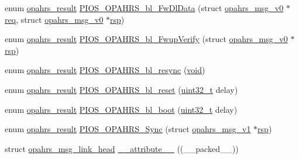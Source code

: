 \begin{DoxyCompactItemize}
\item 
enum \hyperlink{group___p_i_o_s___o_p_a_h_r_s_gaf6fe64d28ea92983e870494d0a5d05bd}{opahrs\-\_\-result} \hyperlink{group___p_i_o_s___o_p_a_h_r_s_gadd69754c1b2e212326e33fb2209ae72e}{P\-I\-O\-S\-\_\-\-O\-P\-A\-H\-R\-S\-\_\-bl\-\_\-\-Fw\-Dl\-Data} (struct \hyperlink{structopahrs__msg__v0}{opahrs\-\_\-msg\-\_\-v0} $\ast$\hyperlink{pios__opahrs__proto_8h_ad651fd9affe5ed0ac9abccd8e2791a2c}{req}, struct \hyperlink{structopahrs__msg__v0}{opahrs\-\_\-msg\-\_\-v0} $\ast$\hyperlink{pios__opahrs__proto_8h_a33704cbdda2899ee80b99a109f814568}{rsp})
\item 
enum \hyperlink{group___p_i_o_s___o_p_a_h_r_s_gaf6fe64d28ea92983e870494d0a5d05bd}{opahrs\-\_\-result} \hyperlink{group___p_i_o_s___o_p_a_h_r_s_ga4bb7842e9f92a0286d39da199a3d5247}{P\-I\-O\-S\-\_\-\-O\-P\-A\-H\-R\-S\-\_\-bl\-\_\-\-Fwup\-Verify} (struct \hyperlink{structopahrs__msg__v0}{opahrs\-\_\-msg\-\_\-v0} $\ast$\hyperlink{pios__opahrs__proto_8h_a33704cbdda2899ee80b99a109f814568}{rsp})
\item 
enum \hyperlink{group___p_i_o_s___o_p_a_h_r_s_gaf6fe64d28ea92983e870494d0a5d05bd}{opahrs\-\_\-result} \hyperlink{group___p_i_o_s___o_p_a_h_r_s_gaa8bdcd7c130fd8eb142b9d211f87be2a}{P\-I\-O\-S\-\_\-\-O\-P\-A\-H\-R\-S\-\_\-bl\-\_\-resync} (\hyperlink{group___n_a_m_e_ga18028b8badbf1ea7e704ccac3c488e82}{void})
\item 
enum \hyperlink{group___p_i_o_s___o_p_a_h_r_s_gaf6fe64d28ea92983e870494d0a5d05bd}{opahrs\-\_\-result} \hyperlink{group___p_i_o_s___o_p_a_h_r_s_gaf2be915c98324c485c1a56d17472ddde}{P\-I\-O\-S\-\_\-\-O\-P\-A\-H\-R\-S\-\_\-bl\-\_\-reset} (\hyperlink{stdint_8h_a435d1572bf3f880d55459d9805097f62}{uint32\-\_\-t} delay)
\item 
enum \hyperlink{group___p_i_o_s___o_p_a_h_r_s_gaf6fe64d28ea92983e870494d0a5d05bd}{opahrs\-\_\-result} \hyperlink{group___p_i_o_s___o_p_a_h_r_s_ga5ef319e1098cc7338f56e9eea00ed761}{P\-I\-O\-S\-\_\-\-O\-P\-A\-H\-R\-S\-\_\-bl\-\_\-boot} (\hyperlink{stdint_8h_a435d1572bf3f880d55459d9805097f62}{uint32\-\_\-t} delay)
\item 
enum \hyperlink{group___p_i_o_s___o_p_a_h_r_s_gaf6fe64d28ea92983e870494d0a5d05bd}{opahrs\-\_\-result} \hyperlink{group___p_i_o_s___o_p_a_h_r_s_gadbd0b219bada97964333612bc3394464}{P\-I\-O\-S\-\_\-\-O\-P\-A\-H\-R\-S\-\_\-\-Sync} (struct \hyperlink{structopahrs__msg__v1}{opahrs\-\_\-msg\-\_\-v1} $\ast$\hyperlink{pios__opahrs__proto_8h_a33704cbdda2899ee80b99a109f814568}{rsp})
\item 
struct \hyperlink{structopahrs__msg__link__head}{opahrs\-\_\-msg\-\_\-link\-\_\-head} \hyperlink{group___p_i_o_s___o_p_a_h_r_s_ga04dd02996eb58d8fd3c159dc959917ea}{\-\_\-\-\_\-attribute\-\_\-\-\_\-} ((\-\_\-\-\_\-packed\-\_\-\-\_\-))
\end{DoxyCompactItemize}
